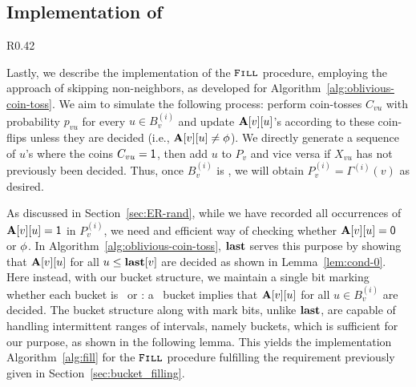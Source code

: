 \subsection{Implementation of }
\label{sec:fill_implement}

\begin{wrapfigure}[13]{R}{0.42\textwidth}
\vspace{-1.5em}
\begin{framed}
    \renewcommand\figurename{Algorithm}
    \caption{Sampling in a Bucket}
    \label{alg:fill}
    \begin{algorithmic}
                \EndIf
            \EndWhile
    \EndProcedure
    \end{algorithmic}
\end{framed}
\end{wrapfigure}

Lastly, we describe the implementation of the $\texttt{\textsc{Fill}}$ procedure, employing the approach of skipping non-neighbors, as developed for Algorithm~\ref{alg:oblivious-coin-toss}. We aim to simulate the following process: perform coin-tosses $C_{vu}$ with probability $p_{vu}$ for every $u \in B_v^{(i)}$ and update $\mathbf{A}[v][u]$'s according to these coin-flips unless they are decided (i.e., $\mathbf{A}[v][u] \neq \phi$). We directly generate a sequence of $u$'s where the coins $C_{vu} = \mathsf{1}$, then add $u$ to $P_v$ and vice versa if $X_{vu}$ has not previously been decided. Thus, once $B_v^{(i)}$ is \filled, we will obtain $P_v^{(i)} = \Gamma^{(i)}(v)$ as desired.

As discussed in Section~\ref{sec:ER-rand}, while we have recorded all occurrences of $\mathbf{A}[v][u]=\mathsf{1}$ in $P_v^{(i)}$, we need and efficient way of checking whether $\mathbf{A}[v][u] = \mathsf{0}$ or $\phi$. In Algorithm~\ref{alg:oblivious-coin-toss}, $\mathbf{last}$ serves this purpose by showing that $\mathbf{A}[v][u]$ for all $u \leq \mathbf{last}[v]$ are decided as shown in Lemma~\ref{lem:cond-0}. Here instead, with our bucket structure, we maintain a single bit marking whether each bucket is \filled~or \unfilled: a \filled~bucket implies that $\mathbf{A}[v][u]$ for all $u \in B_v^{(i)}$ are decided. The bucket structure along with mark bits, unlike $\mathbf{last}$, are capable of handling intermittent ranges of intervals, namely buckets, which is sufficient for our purpose, as shown in the following lemma. This yields the implementation Algorithm~\ref{alg:fill} for the $\texttt{\textsc{Fill}}$ procedure fulfilling the requirement previously given in Section~\ref{sec:bucket_filling}. 

